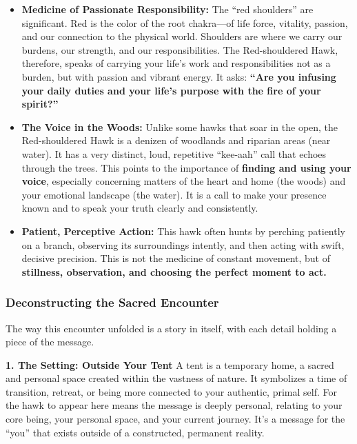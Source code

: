 \documentclass{article}
\begin{document}
\begin{itemize}
\item
  \textbf{Medicine of Passionate Responsibility:} The ``red shoulders''
  are significant. Red is the color of the root chakra---of life force,
  vitality, passion, and our connection to the physical world. Shoulders
  are where we carry our burdens, our strength, and our
  responsibilities. The Red-shouldered Hawk, therefore, speaks of
  carrying your life's work and responsibilities not as a burden, but
  with passion and vibrant energy. It asks: \textbf{``Are you infusing
  your daily duties and your life's purpose with the fire of your
  spirit?''}
\item
  \textbf{The Voice in the Woods:} Unlike some hawks that soar in the
  open, the Red-shouldered Hawk is a denizen of woodlands and riparian
  areas (near water). It has a very distinct, loud, repetitive
  ``kee-aah'' call that echoes through the trees. This points to the
  importance of \textbf{finding and using your voice}, especially
  concerning matters of the heart and home (the woods) and your
  emotional landscape (the water). It is a call to make your presence
  known and to speak your truth clearly and consistently.
\item
  \textbf{Patient, Perceptive Action:} This hawk often hunts by perching
  patiently on a branch, observing its surroundings intently, and then
  acting with swift, decisive precision. This is not the medicine of
  constant movement, but of \textbf{stillness, observation, and choosing
  the perfect moment to act.}
\end{itemize}

\subsubsection*{Deconstructing the Sacred
Encounter}\label{deconstructing-the-sacred-encounter}

The way this encounter unfolded is a story in itself, with each detail
holding a piece of the message.

\textbf{1. The Setting: Outside Your Tent} A tent is a temporary home, a
sacred and personal space created within the vastness of nature. It
symbolizes a time of transition, retreat, or being more connected to
your authentic, primal self. For the hawk to appear here means the
message is deeply personal, relating to your core being, your personal
space, and your current journey. It's a message for the ``you'' that
exists outside of a constructed, permanent reality.
\end{document}

